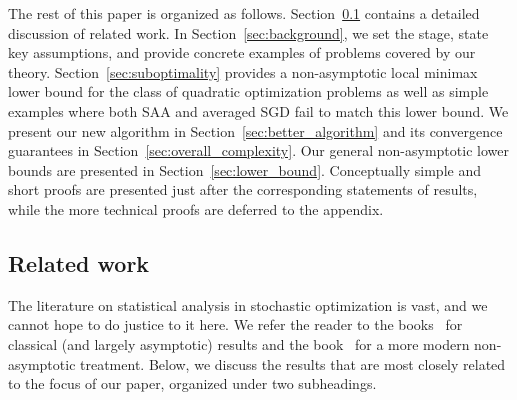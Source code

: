 \documentclass[11pt,twoside]{article}
\numberwithin{equation}{section}
\newcommand{\1}{\mathbf{1}}
\theoremstyle{remark}
\theoremstyle{plain}
\begin{document}
	The rest of this paper is organized as follows. Section~\ref{sec:related_work} contains a detailed discussion of related work. In Section~\ref{sec:background}, we set the stage, state key assumptions, and provide concrete examples of problems covered by our theory. Section~\ref{sec:suboptimality} provides a non-asymptotic local minimax lower bound for the class of quadratic optimization problems as well as simple examples where both SAA and averaged SGD fail to match this lower bound.   We present our new algorithm in Section~\ref{sec:better_algorithm} and its convergence guarantees in Section~\ref{sec:overall_complexity}. Our general non-asymptotic lower bounds are presented in Section~\ref{sec:lower_bound}. Conceptually simple and short proofs are presented just after the corresponding statements of results, while the more technical proofs are deferred to the appendix. 



\subsection{Related work}\label{sec:related_work}


The literature on statistical analysis in stochastic optimization is vast, and we cannot hope to do justice to it here. We refer the reader to the books~\cite{benveniste2012adaptive,shapiro2021lectures} for classical (and largely asymptotic) results and the book~\cite{lan2020first} for a more modern non-asymptotic treatment. Below, we discuss the results that are most closely related to the focus of our paper, organized under two subheadings.
\end{document}
